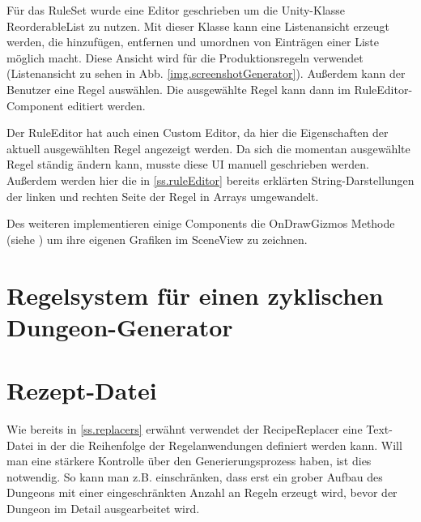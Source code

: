 Für das RuleSet wurde eine Editor geschrieben um die Unity-Klasse ReorderableList zu nutzen. Mit dieser Klasse kann eine Listenansicht erzeugt werden, die hinzufügen, entfernen und umordnen von Einträgen einer Liste möglich macht. Diese Ansicht wird für die Produktionsregeln verwendet (Listenansicht zu sehen in Abb. \ref{img.screenshotGenerator}). Außerdem kann der Benutzer eine Regel auswählen. Die ausgewählte Regel kann dann im RuleEditor-Component editiert werden.

Der RuleEditor hat auch einen Custom Editor, da hier die Eigenschaften der aktuell ausgewählten Regel angezeigt werden. Da sich die momentan ausgewählte Regel ständig ändern kann, musste diese UI manuell geschrieben werden. Außerdem werden hier die in \ref{ss.ruleEditor} bereits erklärten String-Darstellungen der linken und rechten Seite der Regel in Arrays umgewandelt. 

Des weiteren implementieren einige Components die OnDrawGizmos Methode (siehe \cite[Seite: MonoBehaviour.OnDrawGizmos]{unitySciptingReference}) um ihre eigenen Grafiken im SceneView zu zeichnen. 


\section{Regelsystem für einen zyklischen Dungeon-Generator}\label{s.regelsystem}


\section{Rezept-Datei}\label{s.rezeptDatei}

Wie bereits in \ref{ss.replacers} erwähnt verwendet der RecipeReplacer eine Text-Datei in der die Reihenfolge der Regelanwendungen definiert werden kann. Will man eine stärkere Kontrolle über den Generierungsprozess haben, ist dies notwendig. So kann man z.B. einschränken, dass erst ein grober Aufbau des Dungeons mit einer eingeschränkten Anzahl an Regeln erzeugt wird, bevor der Dungeon im Detail ausgearbeitet wird.


